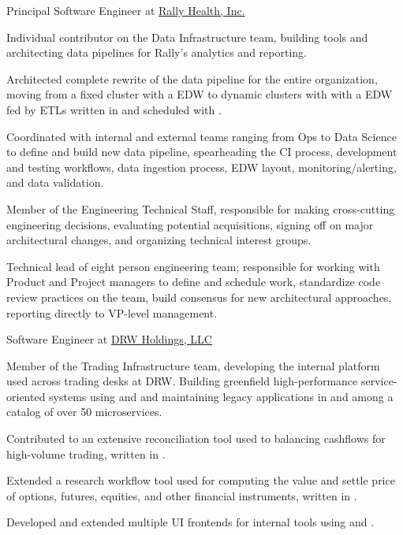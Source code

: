 \documentclass[10pt]{article}
\begin{document}
%
{Principal Software Engineer}%
{at}%
{\href{https://www.rallyhealth.com}{Rally Health, Inc.}}%
{Individual contributor on the Data Infrastructure team, building
  tools and architecting data pipelines for Rally's analytics and
  reporting.

  \begin{exlist}
  \item Architected complete rewrite of the data pipeline for the
    entire organization, moving from a fixed 
    cluster with a \hive EDW to dynamic clusters with
     with a  EDW fed by \spark
    ETLs written in \scala and scheduled with .

  \item Coordinated with internal and external teams ranging from
    Ops to Data Science to define and build new data pipeline,
    spearheading the CI process, development and testing workflows,
    data ingestion process, EDW layout, monitoring/alerting, and
    data validation.

  \item Member of the Engineering Technical Staff, responsible for
    making cross-cutting engineering decisions, evaluating potential
    acquisitions, signing off on major architectural changes, and
    organizing technical interest groups.

  \item Technical lead of eight person engineering team; responsible
    for working with Product and Project managers to define and
    schedule work, standardize code review practices on the team,
    build consensus for new architectural approaches, reporting
    directly to VP-level management.%
  \end{exlist}
}

%
{Software Engineer}%
{at}%
{\href{http://www.drw.com}{DRW Holdings, LLC}}%
{Member of the Trading Infrastructure team, developing the internal
  platform used across trading desks at DRW. Building greenfield
  high-performance service-oriented systems using \clojure and \java
  and maintaining legacy applications in \ruby and \csh among a
  catalog of over 50 microservices.

  \begin{exlist}

    \item Contributed to an extensive reconciliation tool used to
      balancing cashflows for high-volume trading, written in \ruby.

    \item Extended a research workflow tool used for computing the
      value and settle price of options, futures, equities, and
      other financial instruments, written in \clojure.

    \item Developed and extended multiple UI frontends for internal
      tools using  and
      .
  \end{exlist}
}
\end{document}
